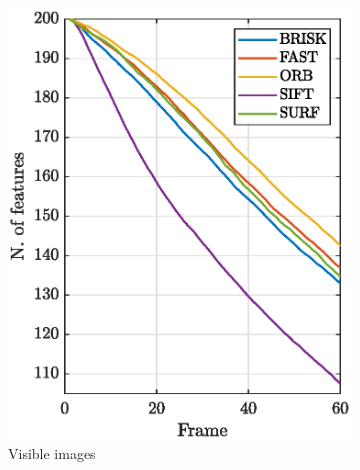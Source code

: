 \begin{figure}[!h]
     \centering
     \begin{subfigure}[b]{0.46\textwidth}
         \centering
         \includegraphics[width=\textwidth]{Images/VISTracking.eps}
         \caption{Visible images}
         \label{fig:trackingvis}
     \end{subfigure}
     \hfill
     \begin{subfigure}[b]{0.46\textwidth}
         \centering

\end{subfigure}
\end{figure}

